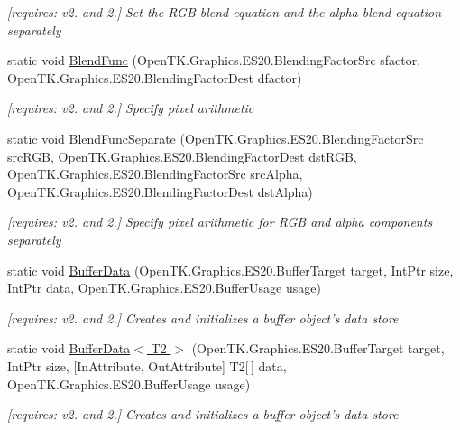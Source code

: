 \begin{DoxyCompactItemize}
\begin{DoxyCompactList}\small\item\em \mbox{[}requires\-: v2. and 2.\mbox{]} Set the R\-G\-B blend equation and the alpha blend equation separately \end{DoxyCompactList}\item 
static void \hyperlink{class_open_t_k_1_1_graphics_1_1_e_s20_1_1_g_l_a0783768762d1f0d7df72a107cd76f0d3}{Blend\-Func} (Open\-T\-K.\-Graphics.\-E\-S20.\-Blending\-Factor\-Src sfactor, Open\-T\-K.\-Graphics.\-E\-S20.\-Blending\-Factor\-Dest dfactor)
\begin{DoxyCompactList}\small\item\em \mbox{[}requires\-: v2. and 2.\mbox{]} Specify pixel arithmetic \end{DoxyCompactList}\item 
static void \hyperlink{class_open_t_k_1_1_graphics_1_1_e_s20_1_1_g_l_a4c9e701e5d72756c6bc80e710313c9f4}{Blend\-Func\-Separate} (Open\-T\-K.\-Graphics.\-E\-S20.\-Blending\-Factor\-Src src\-R\-G\-B, Open\-T\-K.\-Graphics.\-E\-S20.\-Blending\-Factor\-Dest dst\-R\-G\-B, Open\-T\-K.\-Graphics.\-E\-S20.\-Blending\-Factor\-Src src\-Alpha, Open\-T\-K.\-Graphics.\-E\-S20.\-Blending\-Factor\-Dest dst\-Alpha)
\begin{DoxyCompactList}\small\item\em \mbox{[}requires\-: v2. and 2.\mbox{]} Specify pixel arithmetic for R\-G\-B and alpha components separately \end{DoxyCompactList}\item 
static void \hyperlink{class_open_t_k_1_1_graphics_1_1_e_s20_1_1_g_l_a886501a5b7ceedb9d032ffa58c9d701c}{Buffer\-Data} (Open\-T\-K.\-Graphics.\-E\-S20.\-Buffer\-Target target, Int\-Ptr size, Int\-Ptr data, Open\-T\-K.\-Graphics.\-E\-S20.\-Buffer\-Usage usage)
\begin{DoxyCompactList}\small\item\em \mbox{[}requires\-: v2. and 2.\mbox{]} Creates and initializes a buffer object's data store \end{DoxyCompactList}\item 
static void \hyperlink{class_open_t_k_1_1_graphics_1_1_e_s20_1_1_g_l_aab460482294f33dceaaf63bfc2d7d3fb}{Buffer\-Data$<$ T2 $>$} (Open\-T\-K.\-Graphics.\-E\-S20.\-Buffer\-Target target, Int\-Ptr size, \mbox{[}In\-Attribute, Out\-Attribute\mbox{]} T2\mbox{[}$\,$\mbox{]} data, Open\-T\-K.\-Graphics.\-E\-S20.\-Buffer\-Usage usage)
\begin{DoxyCompactList}\small\item\em \mbox{[}requires\-: v2. and 2.\mbox{]} Creates and initializes a buffer object's data store \end{DoxyCompactList}\item 

\end{DoxyCompactItemize}

